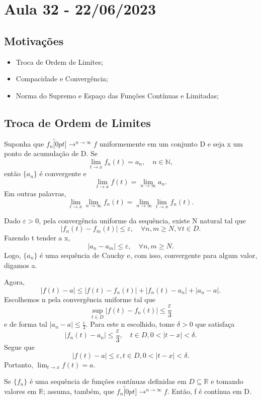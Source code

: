 \documentclass[../analysis_notes.tex]{subfiles}
\begin{document}
\section{Aula 32 - 22/06/2023}
\subsection{Motivações}
\begin{itemize}
	\item Troca de Ordem de Limites;
	\item Compacidade e Convergência;
	\item Norma do Supremo e Espaço das Funções Contínuas e Limitadas;
\end{itemize}
\subsection{Troca de Ordem de Limites}
\begin{theorem*}
	Suponha que \(f_{n}\overbracket[0pt]{\longrightarrow}^{n\to \infty}f\) uniformemente em um conjunto D e seja x um ponto de acumulação de D. Se
	\[
		\lim_{t\to x}f_{n}(t)=a_{n},\quad n\in \mathbb{N},
	\]
	então \(\{a_{n}\}\) é convergente e
	\[
		\lim_{t\to x}f(t)=\lim_{n\to \infty}a_{n}.
	\]
	Em outras palavras,
	\[
		\lim_{t\to x}\lim_{n\to \infty}f_{n}(t)=\lim_{n\to \infty}\lim_{t\to x}f_{n}(t).
	\]
\end{theorem*}
\begin{proof*}
	Dado \(\varepsilon >0\), pela convergência uniforme da sequência, existe N natural tal que
	\[
		|f_{n}(t)-f_{m}(t)|\leq \varepsilon , \quad \forall n, m \geq N, \forall t\in D.
	\]
	Fazendo t tender a x,
	\[
		|a_{n}-a_{m}|\leq \varepsilon,\quad \forall n, m\geq N.
	\]
	Logo, \(\{a_{n}\}\) é uma sequência de Cauchy e, com isso, convergente para algum valor, digamos a.

	Agora,
	\[
		|f(t)-a|\leq |f(t)-f_{n}(t)|+|f_{n}(t)-a_{n}|+|a_{n}-a|.
	\]
	Escolhemos n pela convergência uniforme tal que
	\[
		\sup_{t\in D}|f(t)-f_{n}(t)|\leq \frac{\varepsilon }{3}
	\]
	e de forma tal \(|a_{n}-a|\leq \frac{\varepsilon }{3}\). Para este n escolhido, tome \(\delta >0\) que satisfaça
	\[
		|f_{n}(t)-a_{n}|\leq \frac{\varepsilon }{3},\quad t\in D, 0<|t-x|<\delta .
	\]
	Segue que
	\[
		|f(t)-a|\leq \varepsilon , t\in D, 0<|t-x|<\delta .
	\]
	Portanto, \(\lim_{t\to x}f(t)=a\). \qedsymbol
\end{proof*}
\begin{theorem*}
	Se \(\{f_{n}\}\) é uma sequência de funções contínuas definidas em \(D\subseteq \mathbb{R}\) e tomando valores em \(\mathbb{R}\); assuma, também, que \(f_{n}\overbracket[0pt]{\longrightarrow}^{n\to \infty}f\). Então, f é contínua em D.
\end{theorem*}
\end{document}
